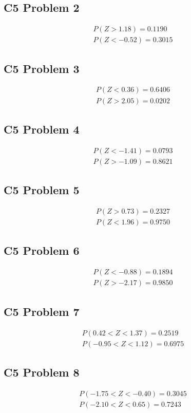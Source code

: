 	\subsection{C5 Problem 2}
	\[
	\begin{array}{l}
	P(Z>1.18)=0.1190\\
	P(Z<-0.52)=0.3015
	\end{array}
	\]

	\subsection{C5 Problem 3}
	\[
	\begin{array}{l}
	P(Z<0.36)=0.6406\\
	P(Z>2.05)=0.0202
	\end{array}
	\]

	\subsection{C5 Problem 4}
	\[
	\begin{array}{l}
	P(Z<-1.41)=0.0793\\
	P(Z>-1.09)=0.8621
	\end{array}
	\]

	\subsection{C5 Problem 5}
	\[
	\begin{array}{l}
	P(Z>0.73)=0.2327\\
	P(Z<1.96)=0.9750
	\end{array}
	\]

	\subsection{C5 Problem 6}
	\[
	\begin{array}{l}
	P(Z<-0.88)=0.1894\\
	P(Z>-2.17)=0.9850
	\end{array}
	\]

	\subsection{C5 Problem 7}
	\[
	\begin{array}{l}
	P(0.42<Z<1.37)=0.2519\\
	P(-0.95<Z<1.12)=0.6975
	\end{array}
	\]

	\subsection{C5 Problem 8}
	\[
	\begin{array}{l}
	P(-1.75<Z<-0.40)=0.3045\\
	P(-2.10<Z<0.65)=0.7243
	\end{array}
	\]

